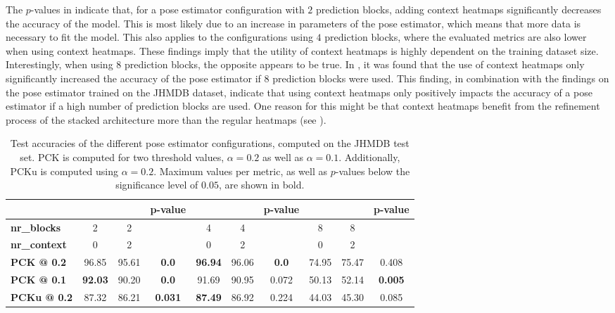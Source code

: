 The $p$-values in  indicate that, for a pose estimator configuration with $2$ prediction blocks, adding context heatmaps significantly decreases the accuracy of the model.
This is most likely due to an increase in parameters of the pose estimator, which means that more data is necessary to fit the model.
This also applies to the configurations using $4$ prediction blocks, where the evaluated metrics are also lower when using context heatmaps.
These findings imply that the utility of context heatmaps is highly dependent on the training dataset size.
Interestingly, when using $8$ prediction blocks, the opposite appears to be true.
In , it was found that the use of context heatmaps only significantly increased the accuracy of the pose estimator if $8$ prediction blocks were used.
This finding, in combination with the findings on the pose estimator trained on the JHMDB dataset, indicate that using context heatmaps only positively impacts the accuracy of a pose estimator if a high number of prediction blocks are used.
One reason for this might be that context heatmaps benefit from the refinement process of the stacked architecture more than the regular heatmaps (see ).

\begin{table}[]
    \small
    \centering
    \begin{tabular}{|l|c|c|c||c|c|c||c|c|c|}
    \hline
        & & & \textbf{p-value} & & & \textbf{p-value} & & & \textbf{p-value} \\ \hline
        \textbf{nr\_blocks} & 2 & 2 &  & 4 & 4 &  & 8 & 8 &  \\ \hline
    \textbf{nr\_context} & 0 & 2 & & 0 & 2 & & 0 & 2 &\\ \hline
        \textbf{PCK @ 0.2} & 96.85 & 95.61 & \textbf{0.0} & \textbf{96.94} & 96.06 & \textbf{0.0} & 74.95 & 75.47 & 0.408 \\ \hline
        \textbf{PCK @ 0.1} & \textbf{92.03} & 90.20 & \textbf{0.0} & 91.69 & 90.95 & 0.072 & 50.13 & 52.14 & \textbf{0.005} \\ \hline
        \textbf{PCKu @ 0.2} & 87.32 & 86.21 & \textbf{0.031} & \textbf{87.49} & 86.92 &  0.224 & 44.03 & 45.30 & 0.085 \\ \hline
    \end{tabular}
    \caption{Test accuracies of the different pose estimator configurations, computed on the JHMDB test set. PCK is computed for two threshold values, $\alpha = 0.2$ as well as $\alpha = 0.1$. Additionally, PCKu is computed using $\alpha = 0.2$. Maximum values per metric, as well as $p$-values below the significance level of $0.05$, are shown in bold.}
    \label{tab:jhmdb_results}
\end{table}

